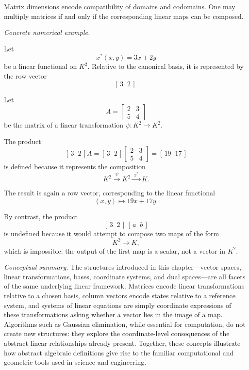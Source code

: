 \medskip

Matrix dimensions encode compatibility of domains and codomains. One may multiply matrices if and only if the corresponding linear maps can be composed.

\medskip

\textit{Concrete numerical example.}

Let
\[
x^*(x,y)=3x+2y
\]
be a linear functional on $K^2$. Relative to the canonical basis, it is represented by the row vector
\[
[\,3\;\;2\,].
\]

Let
\[
A=
\begin{bmatrix}
2 & 3\\
5 & 4
\end{bmatrix}
\]
be the matrix of a linear transformation
\(
\psi:K^2\to K^2.
\)

The product
\[
[\,3\;\;2\,]A
=
[\,3\;\;2\,]
\begin{bmatrix}
2 & 3\\
5 & 4
\end{bmatrix}
=
[\,19\;\;17\,]
\]
is defined because it represents the composition
\[
K^2 \xrightarrow{\;\psi\;} K^2 \xrightarrow{\;x^*\;} K.
\]

The result is again a row vector, corresponding to the linear functional
\[
(x,y)\longmapsto 19x+17y.
\]

\medskip

By contrast, the product
\[
[\,3\;\;2\,]\,[\,a\;\;b\,]
\]
is undefined because it would attempt to compose two maps of the form
\[
K^2 \to K,
\]
which is impossible: the output of the first map is a scalar, not a vector in $K^2$.

\bigskip

\textit{Conceptual summary.} The structures introduced in this chapter---vector spaces, linear transformations, bases, coordinate systems, and dual spaces---are all facets of the same underlying linear framework. Matrices encode linear transformations relative to a chosen basis, column vectors encode states relative to a reference system, and systems of linear equations are simply coordinate expressions of these transformations asking whether a vector lies in the image of a map. Algorithms such as Gaussian elimination, while essential for computation, do not create new structures: they explore the coordinate-level consequences of the abstract linear relationships already present. Together, these concepts illustrate how abstract algebraic definitions give rise to the familiar computational and geometric tools used in science and engineering.

